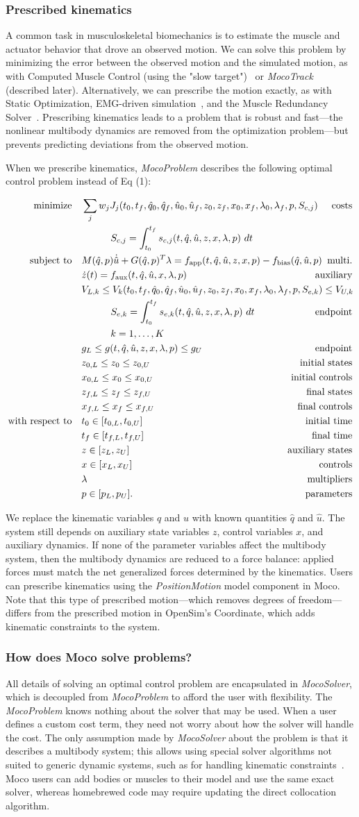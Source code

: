 \documentclass[10pt,letterpaper]{article}
\newcommand{\prescribed}{
\begin{align}
    \begin{aligned}
        \mbox{minimize} \quad & \sum_j w_j J_{j}(t_0, t_f, \hat{q}_0, \hat{q}_f, \hat{u}_0, \hat{u}_f, z_0, z_f, x_{0}, x_{f}, \lambda_0, \mathrlap{\lambda_f, p, S_{c,j})} & \textrm{costs} \\
        & \quad\quad\quad S_{c,j} = \int_{t_0}^{t_f} s_{c,j}(t, \hat{q}, \hat{u}, z, x, \lambda, p)~dt\\
        \mbox{subject to} \quad &
         M(\hat{q}, p)\dot{\hat{u}} + G(\hat{q}, p)^T \lambda = f_{\textrm{app}}(t, \hat{q}, \hat{u}, z, x, p) - \mathrlap{f_{\textrm{bias}}(\hat{q}, \hat{u}, p)} & \textrm{multi.} \\
         & \dot{z}(t) = f_{\textrm{aux}}(t, \hat{q}, \hat{u}, x, \lambda, p) & \textrm{auxiliary} \\
         & V_{L,k} \leq V_k(t_0, t_f, \hat{q}_0, \hat{q}_f, \hat{u}_0, \hat{u}_f, z_0, z_f, x_{0}, x_{f}, \lambda_0, \mathrlap{\lambda_f, p, S_{e,k}) \leq V_{U,k}} \\
        & \quad\quad\quad S_{e,k} = \int_{t_0}^{t_f} s_{e,k}(t, \hat{q}, \hat{u}, z, x, \lambda, p)~dt & \textrm{endpoint} \\
         & \quad\quad\quad k = 1, \ldots, K \\
        & g_{L} \leq g(t, \hat{q}, \hat{u}, z, x, \lambda, p) \leq g_{U} & \textrm{endpoint} \\
         & z_{0,L} \leq z_0 \leq z_{0,U} & \textrm{initial states} \\
         & x_{0,L} \leq x_0 \leq x_{0,U} & \textrm{initial controls}\\
         & z_{f,L} \leq z_f \leq z_{f,U} & \textrm{final states} \\
         & x_{f,L} \leq x_f \leq x_{f,U} & \textrm{final controls} \\
         \mbox{with respect to} \quad
         & t_0 \in [t_{0,L}, t_{0,U}] & \textrm{initial time} \\
         & t_f \in [t_{f,L}, t_{f,U}] & \textrm{final time} \\
         & z \in [z_{L}, z_{U}] & \textrm{auxiliary states} \\
         & x \in [x_{L}, x_{U}] & \textrm{controls} \\
         & \lambda & \textrm{multipliers} \\
         & p \in [p_{L}, p_{U}]. & \textrm{parameters}
    \end{aligned}
\end{align}
}
\begin{document}
\subsubsection*{Prescribed kinematics}

A common task in musculoskeletal biomechanics is to estimate the muscle and actuator behavior that drove an observed motion. We can solve this problem by minimizing the error between the observed motion and the simulated motion, as with Computed Muscle Control (using the "slow target")~\cite{Thelen:2003bba} or \textit{MocoTrack} (described later). Alternatively, we can prescribe the motion exactly, as with Static Optimization, EMG-driven simulation~\cite{Lloyd:2003}, and the Muscle Redundancy Solver~\cite{Groote:2016dq}. Prescribing kinematics leads to a problem that is robust and fast---the nonlinear multibody dynamics are removed from the optimization problem---but prevents predicting deviations from the observed motion.

When we prescribe kinematics, \textit{MocoProblem} describes the following optimal control problem instead of Eq (1):

\prescribed

We replace the kinematic variables $q$ and $u$ with known quantities $\hat{q}$ and $\hat{u}$. The system still depends on auxiliary state variables $z$, control variables $x$, and auxiliary dynamics. If none of the parameter variables affect the multibody system, then the multibody dynamics are reduced to a force balance: applied forces must match the net generalized forces determined by the kinematics. Users can prescribe kinematics using the \textit{PositionMotion} model component in Moco. Note that this type of prescribed motion---which removes degrees of freedom---differs from the prescribed motion in OpenSim’s Coordinate, which adds kinematic constraints to the system.

\subsubsection*{How does Moco solve problems?}

All details of solving an optimal control problem are encapsulated in \textit{MocoSolver}, which is decoupled from \textit{MocoProblem} to afford the user with flexibility. The \textit{MocoProblem} knows nothing about the solver that may be used. When a user defines a custom cost term, they need not worry about how the solver will handle the cost. The only assumption made by \textit{MocoSolver} about the problem is that it describes a multibody system; this allows using special solver algorithms not suited to generic dynamic systems, such as for handling kinematic constraints~\cite{Posa:2016}. Moco users can add bodies or muscles to their model and use the same exact solver, whereas homebrewed code may require updating the direct collocation algorithm.
\end{document}
